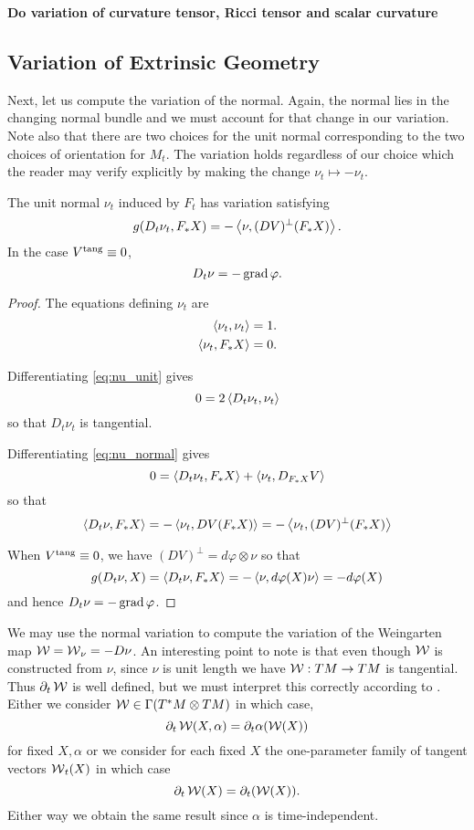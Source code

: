 \textbf{Do variation of curvature tensor, Ricci tensor and scalar curvature}

\subsection*{Variation of Extrinsic Geometry}

Next, let us compute the variation of the normal. Again, the normal lies in the changing normal bundle and we must account for that change in our variation. Note also that there are two choices for the unit normal corresponding to the two choices of orientation for \(M_t\). The variation holds regardless of our choice which the reader may verify explicitly by making the change \(\nu_t \mapsto -\nu_t\).

\begin{lemma}
\label{lem:nu_t}
The unit normal \(\nu_t\) induced by \(F_t\) has variation satisfying
\[
g(D_t \nu_t, F_{\ast} X) = - \left\langle \nu,(DV)^{\perp} (F_{\ast} X) \right\rangle.
\]
In the case \(V^{\operatorname{tang}} \equiv 0\),
\[
D_t \nu = -\operatorname{grad} \varphi.
\]
\end{lemma}

\begin{proof}
The equations defining \(\nu_t\) are
\begin{align}
\label{eq:nu_unit}
\left\langle \nu_t,\nu_t \right\rangle &= 1. \\
\label{eq:nu_normal}
\left\langle \nu_t,F_{\ast} X \right\rangle &= 0.
\end{align}

Differentiating \eqref{eq:nu_unit} gives
\[
0 = 2 \left\langle D_t \nu_t,\nu_t \right\rangle
\]
so that \(D_t \nu_t\) is tangential.

Differentiating \eqref{eq:nu_normal} gives
\[
0 = \left\langle D_t \nu_t,F_{\ast} X \right\rangle + \left\langle \nu_t,D_{F_{\ast} X} V \right\rangle
\]
so that
\[
\left\langle D_t \nu,F_{\ast} X \right\rangle = - \left\langle \nu_t,DV(F_{\ast} X) \right\rangle = - \left\langle \nu_t,(DV)^{\perp}(F_{\ast} X) \right\rangle
\]

When \(V^{\operatorname{tang}} \equiv 0\), we have \((DV)^{\perp} = d\varphi \otimes \nu\) so that
\[
g(D_t \nu, X) = \left\langle D_t \nu,F_{\ast} X \right\rangle = -\left\langle \nu,d\varphi(X) \nu \right\rangle = -d\varphi (X)
\]
and hence \(D_t \nu = - \operatorname{grad} \varphi\).
\end{proof}

We may use the normal variation to compute the variation of the Weingarten map \(\operatorname{\mathcal{W}} = \operatorname{\mathcal{W}}_{\nu} = -D\nu\). An interesting point to note is that even though \(\operatorname{\mathcal{W}}\) is constructed from \(\nu\), since \(\nu\) is unit length we have \(\operatorname{\mathcal{W}} : TM \to TM\) is tangential. Thus \(\partial_t \operatorname{\mathcal{W}}\) is well defined, but we must interpret this correctly according to . Either we consider \(\operatorname{\mathcal{W}} \in \Gamma(T^{\ast} M \otimes TM)\) in which case,
\[
\partial_t \operatorname{\mathcal{W}} (X, \alpha) = \partial_t \alpha(\operatorname{\mathcal{W}}(X))
\]
for fixed \(X, \alpha\) or we consider for each fixed \(X\) the one-parameter family of tangent vectors \(\operatorname{\mathcal{W}}_t(X)\) in which case
\[
\partial_t \operatorname{\mathcal{W}} (X) = \partial_t (\operatorname{\mathcal{W}}(X)).
\]
Either way we obtain the same result since \(\alpha\) is time-independent.

